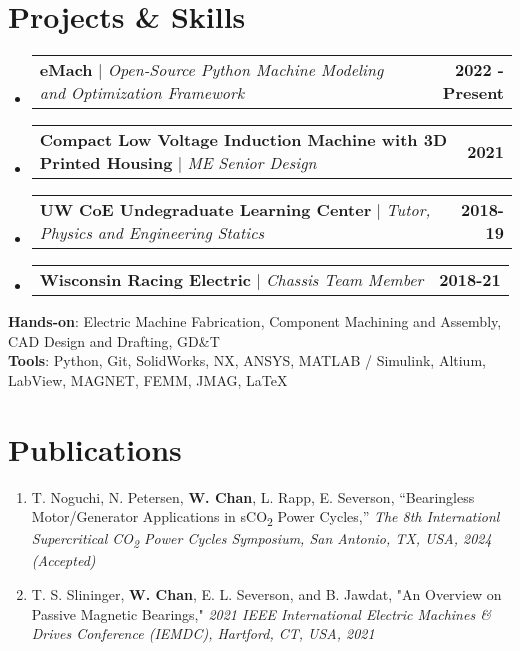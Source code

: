 \documentclass[letterpaper,11pt]{article}
\makeatletter
\newcommand{\resumePublicationItem}[1]{
  \item\small{
    {#1 \vspace{-6pt}}
  }
}
\newcommand{\resumeProjectHeading}[2]{
    \vspace{-2pt}\item
    \begin{tabular*}{1.0\textwidth}[t]{l@{\extracolsep{\fill}}r}
      \small#1 & \textbf{\small #2}\\
    \end{tabular*}\vspace{-20pt}
}
\newcommand{\resumeSubHeadingListStart}{\begin{itemize}[leftmargin=0.0in, label={}]}
\newcommand{\resumeSubHeadingListEnd}{\end{itemize}}
\newcommand{\resumePublicationListStart}{\begin{enumerate}[leftmargin=0.15in]}
\newcommand{\resumePublicationListEnd}{\end{enumerate}\vspace{-16pt}}
\makeatother
\begin{document}
\section{Projects \& Skills}
\resumeSubHeadingListStart
\resumeProjectHeading
{\textbf{eMach} $|$ \emph{Open-Source Python Machine Modeling and Optimization Framework}}{2022 - Present}

\resumeProjectHeading
{\textbf{Compact Low Voltage Induction Machine with 3D Printed Housing} $|$ \emph{ME Senior Design}}{2021}

\resumeProjectHeading
{\textbf{UW CoE Undegraduate Learning Center} $|$ \emph{Tutor, Physics and Engineering Statics}}{2018-19}

\resumeProjectHeading
{\textbf{Wisconsin Racing Electric} $|$ \emph{Chassis Team Member}}{2018-21}

\resumeSubHeadingListEnd

\begin{itemize}[leftmargin=0in, label={}]
  \small{\item{
        \textbf{Hands-on}{: Electric Machine Fabrication, Component Machining and Assembly, CAD Design and Drafting, GD\&T} \\
        \textbf{Tools}{: Python, Git, SolidWorks, NX, ANSYS, MATLAB / Simulink, Altium,  LabView, MAGNET, FEMM, JMAG, \LaTeX } \\
        }}
\end{itemize}
\vspace{-16pt}

\section{Publications}
\resumePublicationListStart
\resumePublicationItem{T. Noguchi, N. Petersen, \textbf{W. Chan}, L. Rapp, E. Severson,  “Bearingless Motor/Generator Applications in sCO\textsubscript{2} Power Cycles,” \textit{The 8th Internationl Supercritical CO\textsubscript{2} Power Cycles Symposium, San Antonio, TX, USA, 2024 (Accepted)}}

\resumePublicationItem{T. S. Slininger, \textbf{W. Chan}, E. L. Severson, and B. Jawdat, "An Overview on Passive Magnetic Bearings," \textit{2021 IEEE International Electric Machines \& Drives Conference (IEMDC), Hartford, CT, USA, 2021}}
\resumePublicationListEnd
\vspace{5pt}
\end{document}
